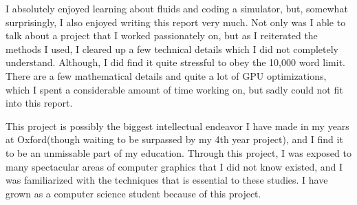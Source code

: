 I absolutely enjoyed learning about fluids and coding a simulator, but, somewhat surprisingly, I also enjoyed writing this report very much. Not only was I able to talk about a project that I worked passionately on, but as I reiterated the methods I used, I cleared up a few technical details which I did not completely understand. Although, I did find it quite stressful to obey the 10,000 word limit. There are a few mathematical details and quite a lot of GPU optimizations, which I spent a considerable amount of time working on, but sadly could not fit into this report.

This project is possibly the biggest intellectual endeavor I have made in my years at Oxford(though waiting to be surpassed by my 4th year project), and I find it to be an unmissable part of my education. Through this project, I was exposed to many spectacular areas of computer graphics that I did not know existed, and I was familiarized with the techniques that is essential to these studies. I have grown as a computer science student because of this project.